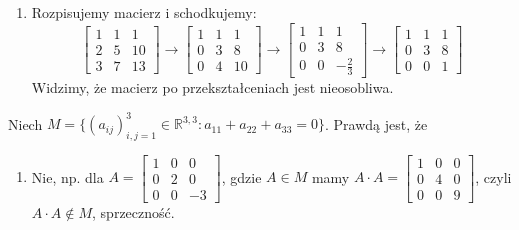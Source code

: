 \begin{solutions}
\begin{enumerate}[\bf A.]
        \item Rozpisujemy macierz i schodkujemy:
        $$
        \begin{bmatrix}
            1 & 1 & 1 \\
            2 & 5 & 10 \\
            3 & 7 & 13
        \end{bmatrix}\to
        \begin{bmatrix}
            1 & 1 & 1 \\
            0 & 3 & 8 \\
            0 & 4 & 10
        \end{bmatrix}\to
        \begin{bmatrix}
            1 & 1 & 1 \\
            0 & 3 & 8 \\
            0 & 0 & -\frac{2}{3}
        \end{bmatrix}\to
        \begin{bmatrix}
            1 & 1 & 1 \\
            0 & 3 & 8 \\
            0 & 0 & 1
        \end{bmatrix}
        $$
        Widzimy, że macierz po przekształceniach jest nieosobliwa.
    \end{enumerate}
    
    \sol Niech $M = \{(a_{ij})_{i,j=1}^{3} \in \mathbb{R}^{3,3} : a_{11}+a_{22}+a_{33}=0 \}$. Prawdą jest, że

    \begin{enumerate}[\bf A.]
        \item Nie, np. dla $A =
        \begin{bmatrix}
            1 & 0 & 0 \\
            0 & 2 & 0 \\
            0 & 0 & -3
        \end{bmatrix}$, gdzie $A \in M$ mamy $A \cdot A =
        \begin{bmatrix}
            1 & 0 & 0 \\
            0 & 4 & 0 \\
            0 & 0 & 9
        \end{bmatrix}$, czyli $A \cdot A \notin M$, sprzeczność.


\end{enumerate}
\end{solutions}
